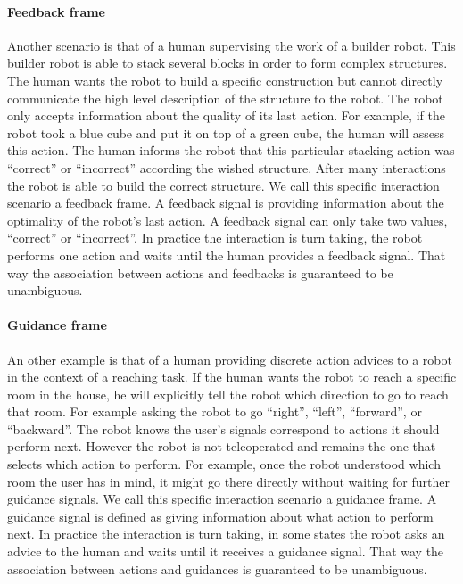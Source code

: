\paragraph{Feedback frame}
Another scenario is that of a human supervising the work of a builder robot. This builder robot is able to stack several blocks in order to form complex structures. The human wants the robot to build a specific construction but cannot directly communicate the high level description of the structure to the robot. The robot only accepts information about the quality of its last action. For example, if the robot took a blue cube and put it on top of a green cube, the human will assess this action.  The human informs the robot that this particular stacking action was ``correct'' or ``incorrect'' according the wished structure. After many interactions the robot is able to build the correct structure. We call this specific interaction scenario a feedback frame. A feedback signal is providing information about the optimality of the robot's last action. A feedback signal can only take two values, ``correct'' or ``incorrect''. In practice the interaction is turn taking, the robot performs one action and waits until the human provides a feedback signal. That way the association between actions and feedbacks is guaranteed to be unambiguous.

\paragraph{Guidance frame} An other example is that of a human providing discrete action advices to a robot in the context of a reaching task. If the human wants the robot to reach a specific room in the house, he will explicitly tell the robot which direction to go to reach that room. For example asking the robot to go ``right'', ``left'', ``forward'', or ``backward''. The robot knows the user's signals correspond to actions it should perform next. However the robot is not teleoperated and remains the one that selects which action to perform. For example, once the robot understood which room the user has in mind, it might go there directly without waiting for further guidance signals. We call this specific interaction scenario a guidance frame. A guidance signal is defined as giving information about what action to perform next. In practice the interaction is turn taking, in some states the robot asks an advice to the human and waits until it receives a guidance signal. That way the association between actions and guidances is guaranteed to be unambiguous.

